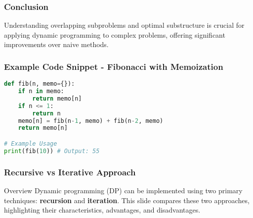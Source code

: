 \documentclass[aspectratio=169]{beamer}
\begin{document}
\begin{frame}[fragile]
    \frametitle{Conclusion}
    Understanding overlapping subproblems and optimal substructure is crucial for applying dynamic programming to complex problems, offering significant improvements over naive methods.
\end{frame}

\begin{frame}[fragile]
    \frametitle{Example Code Snippet - Fibonacci with Memoization}
    \begin{lstlisting}[language=Python]
def fib(n, memo={}):
    if n in memo:
        return memo[n]
    if n <= 1:
        return n
    memo[n] = fib(n-1, memo) + fib(n-2, memo)
    return memo[n]

# Example Usage
print(fib(10)) # Output: 55
    \end{lstlisting}
\end{frame}

\begin{frame}
  \frametitle{Recursive vs Iterative Approach}
  \begin{block}{Overview}
    Dynamic programming (DP) can be implemented using two primary techniques: \textbf{recursion} and \textbf{iteration}. This slide compares these two approaches, highlighting their characteristics, advantages, and disadvantages.
  \end{block}
\end{frame}
\end{document}
